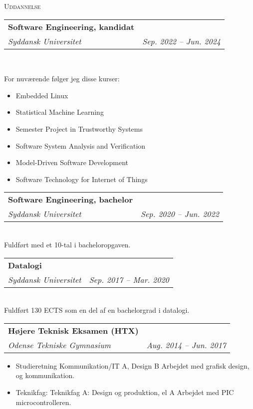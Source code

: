 \documentclass[11pt]{article}
\makeatletter
\newcommand{\resumeSubheading}[4]{
  \noindent\begin{tabular*}{0.98\textwidth}[t]{l@{\extracolsep{\fill}}r}
    \noindent \textbf{#3} & \textit{\small #2} \\ \vspace{-3pt} 
    \noindent \textit{\small #1} & \textit{\small #4} 
  \end{tabular*}\vspace{7pt}
}
\makeatother
\begin{document}
\vspace{0.3cm}
\noindent\large{\scshape{Uddannelse}} \newline
\noindent{\rule[0.3cm]{\textwidth}{0.4pt}}

\resumeSubheading{Syddansk Universitet}{}{Software Engineering, kandidat}{Sep.
2022 -- Jun. 2024}\\\vspace{0.25cm}
  \vspace{-0.3cm}
  {\indent\small 
  For nuværende følger jeg disse kurser: 
  \begin{itemize}
  \setlength{\itemsep}{-1pt}
    \item Embedded Linux
    \item Statistical Machine Learning
    \item Semester Project in Trustworthy Systems
    \item Software System Analysis and Verification
    \item Model-Driven Software Development
    \item Software Technology for Internet of Things
  \end{itemize}} 

\vspace{0.3cm}

\resumeSubheading{Syddansk Universitet}{}{Software Engineering, bachelor}{Sep.
2020 -- Jun. 2022}\\\vspace{0.25cm}
{\indent\small Fuldført med et 10-tal i bacheloropgaven.}

\resumeSubheading{Syddansk Universitet}{}{Datalogi}{Sep. 2017
-- Mar. 2020}\\\vspace{0.25cm} 
{\indent\small Fuldført 130 ECTS som en del af en bachelorgrad i datalogi.}
  
\vspace{0.3cm}

\resumeSubheading{Odense Tekniske Gymnasium}{}{Højere Teknisk Eksamen (HTX)}{Aug. 2014 -- Jun. 2017}
{\small \begin{itemize}\vspace{-0.25cm}
  \setlength{\itemsep}{-1pt}
  \item Studieretning Kommunikation/IT A, Design B
    \subitem Arbejdet med grafisk design, og kommunikation.
  \item Teknikfag: Teknikfag A: Design og produktion, el A
    \subitem\footnotesize Arbejdet med PIC microcontrolleren.
\end{itemize}
} \vspace{0.5cm}
\end{document}
